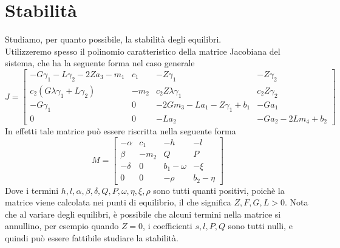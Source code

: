 \documentclass[12pt,a4paper]{article}
\numberwithin{theorem}{section}
\newtheorem{definition}{Definizione}
\numberwithin{definition}{section}
\numberwithin{example}{section}
\newcounter{theo}[section]\setcounter{theo}{0}
\newcounter{defi}[section]\setcounter{defi}{0}
\begin{document}
\section{Stabilità}
Studiamo, per quanto possibile, la stabilità degli equilibri. \\
Utilizzeremo spesso il polinomio caratteristico della matrice Jacobiana del sistema, che ha la seguente forma nel caso generale
\[
J=\left[\begin{array}{cccc}
	-G \gamma_{1}-L \gamma_{2}-2 Z a_{3}-m_{1} & c_{1} & -Z \gamma_{1} & -Z \gamma_{2} 
	\\
	c_{2} \left(G \lambda  \gamma_{1}+L \gamma_{2}\right) & -m_{2} & c_{2} Z \lambda  \gamma_{1} & c_{2} Z \gamma_{2} 
	\\
	-G \gamma_{1} & 0 & -2 G m_{3}-L a_{1}-Z \gamma_{1}+b_{1} & -G a_{1} 
	\\
	0 & 0 & -L a_{2} & -G a_{2}-2 L m_{4}+b_{2} 
\end{array}\right]
\]
In effetti tale matrice può essere riscritta nella seguente forma
\[
M=\left[\begin{array}{cccc}
   -\alpha  & c_{1} & -h  & -l  
	\\
	\beta  & -m_{2} & Q  & P  
	\\
	-\delta  & 0 & b_{1}-\omega  & -\xi  
	\\
	0 & 0 & -\rho  & b_{2}-\eta  
\end{array}\right]
\]
Dove i termini $h,l, \alpha, \beta, \delta, Q, P, \omega, \eta, \xi, \rho$ sono tutti quanti positivi, poichè la matrice viene calcolata nei punti di equilibrio, il che significa $Z,F,G,L>0$. Nota che al variare degli equilibri, è possibile che alcuni termini nella matrice si annullino, per esempio quando $Z=0$, i coefficienti $s,l,P,Q$ sono tutti nulli, e quindi può essere fattibile studiare la stabilità.
\end{document}
